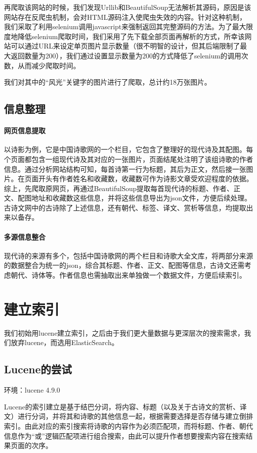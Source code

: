 \documentclass[a4paper, 10pt]{article}
\begin{document}
再爬取该网站的时候，我们发现Urllib和BeautifulSoup无法解析其源码，原因是该网站存在反爬虫机制，会对HTML源码注入使爬虫失效的内容。针对这种机制，我们采取了利用selenium调用javascript来强制返回其完整源码的方法。为了最大限度地降低selenium爬取时间，我们采用了先下载全部页面再解析的方式，所幸该网站可以通过URL来设定单页图片显示数量（很不明智的设计，但其后端限制了最大返回数量为200），我们通过设置显示数量为200的方式降低了selenium的调用次数，从而减少爬取时间。

我们对其中的“风光”关键字的图片进行了爬取，总计约18万张图片。


\subsection{信息整理}
\paragraph{网页信息提取}
以诗影为例，它是中国诗歌网的一个栏目，它包含了整理好的现代诗及其配图。每个页面都包含一组现代诗及其对应的一张图片，页面结尾处注明了该组诗歌的作者信息。通过分析网站结构可知，每首诗第一行为标题，其后为正文，然后接一张图片。在页面开头有作者姓名和收藏数，收藏数可作为诗影文章受欢迎程度的依据。综上，先爬取原网页，再通过BeautifulSoup提取每首现代诗的标题、作者、正文、配图地址和收藏数这些信息，并将这些信息导出为json文件，方便后续处理。古诗文网中的古诗除了上述信息，还有朝代、标签、译文、赏析等信息，均提取出来以备存。

\paragraph{多源信息整合}
现代诗的来源有多个，包括中国诗歌网的两个栏目和诗歌大全文库，将两部分来源的数据整合为统一的json，综合其标题、作者、正文、配图等信息，古诗文还需考虑朝代、诗体等。作者信息也需抽取出来单独做一个数据文件，方便后续索引。

\section{建立索引}
我们初始用lucene建立索引，之后由于我们更大量数据与更深层次的搜索需求，我们放弃lucene，而选用ElasticSearch。

\subsection{Lucene的尝试}
环境：lucene 4.9.0

Lucene的索引建立是基于结巴分词，将内容、标题（以及关于古诗文的赏析、译文）进行分词，并将其和诗歌的其他信息一起，根据需要选择是否存储与建立倒排索引。由此对应的索引搜索将诗歌的内容作为必须匹配项，而将标题、作者、朝代信息作为“或”逻辑匹配项进行组合搜索，由此可以提升作者想要搜索内容在搜索结果页面的次序。
\end{document}
